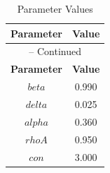 \begin{center}
\begin{longtable}{cc}
\caption{Parameter Values}\\%
\toprule%
\multicolumn{1}{c}{\textbf{Parameter}} &
\multicolumn{1}{c}{\textbf{Value}}  \\%
\midrule%
\endfirsthead
\multicolumn{2}{c}{{\tablename} \thetable{} -- Continued}\\%
\midrule%
\multicolumn{1}{c}{\textbf{Parameter}} &
\multicolumn{1}{c}{\textbf{Value}} \\%
\midrule%
\endhead
$beta$ 	 & 	 0.990 \\
$delta$ 	 & 	 0.025 \\
$alpha$ 	 & 	 0.360 \\
$rhoA$ 	 & 	 0.950 \\
$con$ 	 & 	 3.000 \\
\bottomrule%
\end{longtable}
\end{center}
